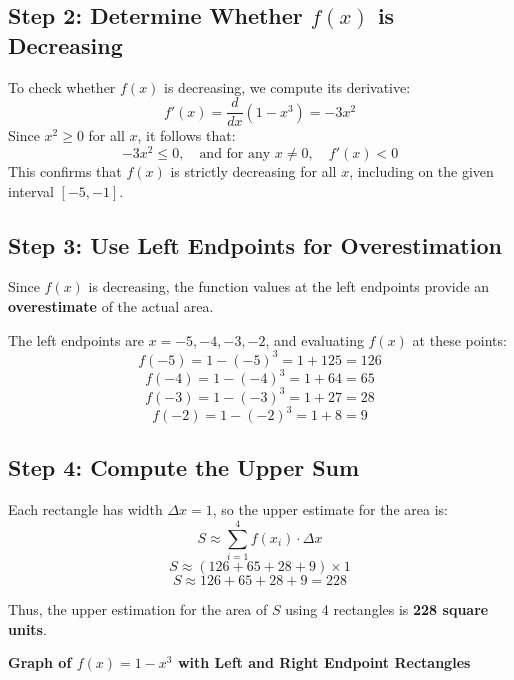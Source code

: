 \documentclass{article}
\begin{document}
\subsection*{Step 2: Determine Whether $f(x)$ is Decreasing}
To check whether $f(x)$ is decreasing, we compute its derivative:
\[
f'(x) = \frac{d}{dx} (1 - x^3) = -3x^2
\]
Since $x^2 \geq 0$ for all $x$, it follows that:
\[
-3x^2 \leq 0, \quad \text{and for any } x \neq 0, \quad f'(x) < 0
\]
This confirms that $f(x)$ is strictly decreasing for all $x$, including on the given interval $[-5, -1]$.

\subsection*{Step 3: Use Left Endpoints for Overestimation}
Since $f(x)$ is decreasing, the function values at the left endpoints provide an \textbf{overestimate} of the actual area.

The left endpoints are $x = -5, -4, -3, -2$, and evaluating $f(x)$ at these points:
\[
f(-5) = 1 - (-5)^3 = 1 + 125 = 126
\]
\[
f(-4) = 1 - (-4)^3 = 1 + 64 = 65
\]
\[
f(-3) = 1 - (-3)^3 = 1 + 27 = 28
\]
\[
f(-2) = 1 - (-2)^3 = 1 + 8 = 9
\]

\subsection*{Step 4: Compute the Upper Sum}
Each rectangle has width $\Delta x = 1$, so the upper estimate for the area is:
\[
S \approx \sum_{i=1}^{4} f(x_i) \cdot \Delta x
\]
\[
S \approx (126 + 65 + 28 + 9) \times 1
\]
\[
S \approx 126 + 65 + 28 + 9 = 228
\]

Thus, the upper estimation for the area of $S$ using 4 rectangles is \textbf{228 square units}.
\begin{center}
    \textbf{Graph of $f(x) = 1 - x^3$ with Left and Right Endpoint Rectangles}
\end{center}
\end{document}
